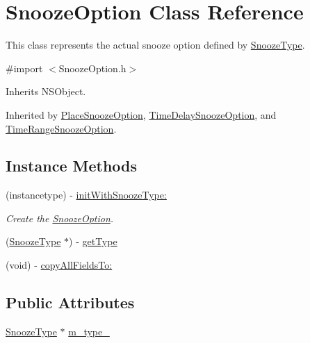 \hypertarget{interface_snooze_option}{}\section{Snooze\+Option Class Reference}
\label{interface_snooze_option}


This class represents the actual snooze option defined by \hyperlink{interface_snooze_type}{Snooze\+Type}.  




{\ttfamily \#import $<$Snooze\+Option.\+h$>$}



Inherits N\+S\+Object.



Inherited by \hyperlink{interface_place_snooze_option}{Place\+Snooze\+Option}, \hyperlink{interface_time_delay_snooze_option}{Time\+Delay\+Snooze\+Option}, and \hyperlink{interface_time_range_snooze_option}{Time\+Range\+Snooze\+Option}.

\subsection*{Instance Methods}
\begin{DoxyCompactItemize}
\item 
(instancetype) -\/ \hyperlink{interface_snooze_option_ad70c83ce32d788d8e5439f29ff203588}{init\+With\+Snooze\+Type\+:}
\begin{DoxyCompactList}\small\item\em Create the \hyperlink{interface_snooze_option}{Snooze\+Option}. \end{DoxyCompactList}\item 
(\hyperlink{interface_snooze_type}{Snooze\+Type} $\ast$) -\/ \hyperlink{interface_snooze_option_a27abcf3f851aefa15292100d32c8e152}{get\+Type}
\item 
(void) -\/ \hyperlink{interface_snooze_option_a4d19ae7b42ae14f30e83473bf405c617}{copy\+All\+Fields\+To\+:}
\end{DoxyCompactItemize}
\subsection*{Public Attributes}
\begin{DoxyCompactItemize}
\item 
\hyperlink{interface_snooze_type}{Snooze\+Type} $\ast$ \hyperlink{interface_snooze_option_a223d2725a927cfc5d45640881030a988}{m\+\_\+type\+\_\+}
\end{DoxyCompactItemize}


